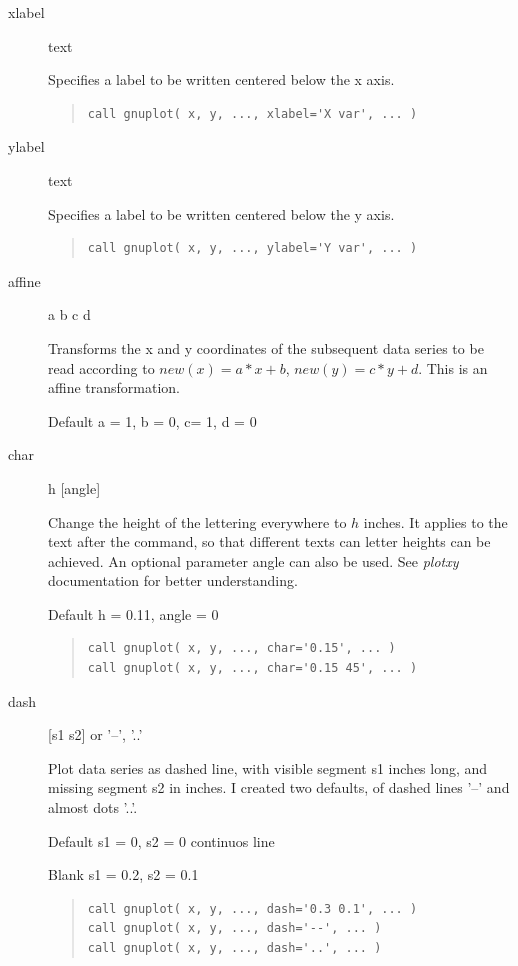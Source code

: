 \documentclass{article}
\begin{document}
\begin{description}
\item[xlabel] text

Specifies a label to be written centered below the x axis.
\begin{quote}
\begin{verbatim}
call gnuplot( x, y, ..., xlabel='X var', ... )
\end{verbatim}
\end{quote}

\item[ylabel] text

Specifies a label to be written centered below the y axis.
\begin{quote}
\begin{verbatim}
call gnuplot( x, y, ..., ylabel='Y var', ... )
\end{verbatim}
\end{quote}

\item[affine] a b c d

Transforms the x and y coordinates of the subsequent data series to be read according to 
$ new(x) = a*x + b$, $new(y) = c*y + d$. This is an affine transformation. 

Default a = 1, b = 0, c= 1, d = 0

\item[char] h [angle]

Change the height of the lettering everywhere to $h$ inches. It applies to the text after the command, so that different texts can letter heights can be achieved. An optional parameter angle can also be used. See {\it plotxy} documentation for better understanding. 

Default h = 0.11, angle = 0
\begin{quote}
\begin{verbatim}
call gnuplot( x, y, ..., char='0.15', ... )
call gnuplot( x, y, ..., char='0.15 45', ... )
\end{verbatim}
\end{quote}

\item[dash] [s1 s2] or '--', '..'

Plot data series as dashed line, with visible segment s1 inches long, and missing segment s2 in inches. I created two defaults, of dashed lines '--' and almost dots '..'. 

Default s1  = 0, s2 = 0    continuos line

Blank s1 = 0.2, s2 = 0.1
\begin{quote}
\begin{verbatim}
call gnuplot( x, y, ..., dash='0.3 0.1', ... )
call gnuplot( x, y, ..., dash='--', ... )
call gnuplot( x, y, ..., dash='..', ... )
\end{verbatim}
\end{quote}


\end{description}
\end{document}
